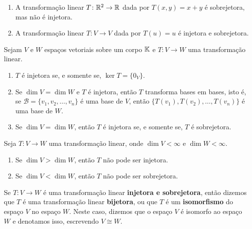\begin{exemplos}
  \begin{enumerate}[label={\arabic*})]
    \item A transforma\c{c}\~ao linear $T \colon \mathbb{R}^2 \to \mathbb{R}$ dada por $T(x,y) = x + y$ \'e sobrejetora, mas n\~ao \'e injetora.

    \item A transforma\c{c}\~ao linear $T \colon V \to V$ dada por $T(u) = u$ \'e injetora e sobrejetora.
  \end{enumerate}
\end{exemplos}

\begin{proposicao}\label{caracteriza_transformacao_injetora}
  Sejam $V$ e $W$ espa\c{c}os vetoriais sobre um corpo $\mathbb{K}$ e $T \colon V \to W$ uma transforma\c{c}\~ao linear.
    \begin{enumerate}[label={\roman*})]
      \item $T$ \'e injetora se, e somente se, $\ker T = \{0_V\}$.

      \item Se $\dim V = \dim W$ e $T$ é injetora, então $T$ transforma bases em bases, isto é, se $\mathcal{B} = \{v_1, v_2, \dots, v_n\}$ é uma base de $V$, então $\{T(v_1), T(v_2), \dots, T(v_n)\}$ é uma base de $W$.

      \item Se $\dim V = \dim W$, então $T$ é injetora se, e somente se, $T$ é sobrejetora.
    \end{enumerate}
\end{proposicao}

\begin{observacoes}
  Seja $T \colon V \to W$ uma transformação linear, onde $\dim V < \infty$ e $\dim W < \infty$.
  \begin{enumerate}[label={\roman*})]
    \item Se $\dim V > \dim W$, então $T$ não pode ser injetora.

    \item Se $\dim V < \dim W$, então $T$ não pode ser sobrejetora.
  \end{enumerate}
\end{observacoes}

\begin{definicao}
  Se $T \colon V \to W$ é uma transformação linear \textbf{injetora e sobrejetora}, então dizemos que $T$ é uma transformação linear \textbf{bijetora}, ou que $T$ é um \textbf{isomorfismo} do espaço $V$ no espaço $W$. Neste caso, dizemos que o espaço $V$ é isomorfo ao espaço $W$ e denotamos isso, escrevendo $V \cong W$.
\end{definicao}

